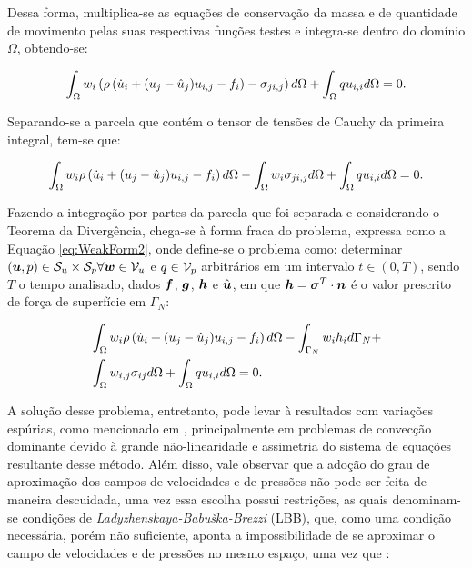 Dessa forma, multiplica-se as equações de conservação da massa e de quantidade de movimento pelas suas respectivas funções testes e integra-se dentro do domínio $\Omega$, obtendo-se:

\begin{equation}
    \int_{\Omega}{w_i\left({\rho\left({\dot{u}_i+(u_j-\hat{u}_j)u_{i,j}-f_i}\right)-\sigma_{ji,j}}\right) d\Omega}+\int_{\Omega}{qu_{i,i} d\Omega}=0\text{.}
\end{equation}

Separando-se a parcela que contém o tensor de tensões de Cauchy da primeira integral, tem-se que:

\begin{equation}
    \int_{\Omega}{w_i\rho\left({\dot{u}_i+(u_j-\hat{u}_j)u_{i,j}-f_i}\right) d\Omega}-\int_{\Omega}{w_i\sigma_{ji,j} d\Omega}+\int_{\Omega}{qu_{i,i} d\Omega}=0\text{.}
    \label{eq:WeakForm1}
\end{equation}

Fazendo a integração por partes da parcela que foi separada e considerando o Teorema da Divergência, chega-se à forma fraca do problema, expressa como a Equação \ref{eq:WeakForm2}, onde define-se o problema como: determinar $(\boldsymbol{u},p)\in\mathcal{S}_u\times\mathcal{S}_p\forall\boldsymbol{w}\in\mathcal{V}_u$ e $q\in\mathcal{V}_p$ arbitrários em um intervalo $t\in(0,T)$, sendo $T$ o tempo analisado, dados $\boldsymbol{f}$, $\boldsymbol{g}$, $\boldsymbol{h}$ e $\hat{\boldsymbol{u}}$, em que $\boldsymbol{h}=\boldsymbol{\sigma}^T\cdot\boldsymbol{n}$ é o valor prescrito de força de superfície em $\Gamma_N$:

\begin{equation}
    \begin{split}
        &\int_{\Omega}{w_i\rho\left({\dot{u}_i+(u_j-\hat{u}_j)u_{i,j}-f_i}\right) d\Omega}-\int_{\Gamma_N}{w_ih_i d\Gamma_N}+\\
        &\int_{\Omega}{w_{i,j}\sigma_{ij} d\Omega}+\int_{\Omega}{qu_{i,i} d\Omega}=0\text{.}
    \end{split}
    \label{eq:WeakForm2}
\end{equation}

A solução desse problema, entretanto, pode levar à resultados com variações espúrias, como mencionado em \cite{fernandes2020tecnica,donea2003finite,brooks1982streamline}, principalmente em problemas de convecção dominante devido à grande não-linearidade e assimetria do sistema de equações resultante desse método. Além disso, vale observar que a adoção do grau de aproximação dos campos de velocidades e de pressões não pode ser feita de maneira descuidada, uma vez essa escolha possui restrições, as quais denominam-se condições de \textit{Ladyzhenskaya-Babuška-Brezzi} (LBB), que, como uma condição necessária, porém não suficiente, aponta a impossibilidade de se aproximar o campo de velocidades e de pressões no mesmo espaço, uma vez que \cite{donea2003finite}:

